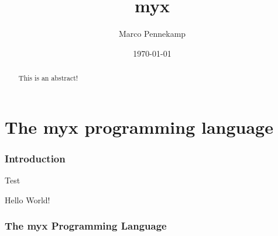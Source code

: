 \documentclass{article}
\begin{document}
\title{myx}
\author{Marco Pennekamp}
\date{\today}
\maketitle


\begin{abstract}

This is an abstract!

\end{abstract}



\part{The myx programming language}



\section{Introduction}




Test


Hello World!



\section{The myx Programming Language}
\end{document}
